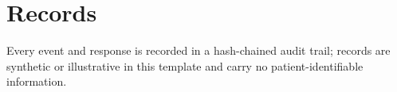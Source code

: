\section{Records}
\label{sec:e}

Every event and response is recorded in a hash-chained audit trail; records are synthetic or illustrative in this template and carry no patient-identifiable information.
